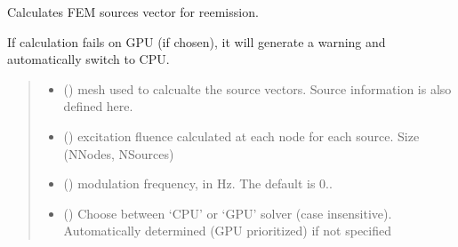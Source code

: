 \documentclass[letterpaper,10pt,english]{sphinxmanual}
\begin{document}
\begin{fulllineitems}
\label{\detokenize{_autosummary/nirfasterff.math.gen_sources_fl:nirfasterff.math.gen_sources_fl}}
\pysigstartsignatures
{}
\pysigstopsignatures
\sphinxAtStartPar
Calculates FEM sources vector for re\sphinxhyphen{}emission.

\sphinxAtStartPar
If calculation fails on GPU (if chosen), it will generate a warning and automatically switch to CPU.
\begin{quote}\begin{description}
\begin{itemize}
\item {} 
\sphinxAtStartPar
{} () \textendash{} mesh used to calcualte the source vectors. Source information is also defined here.

\item {} 
\sphinxAtStartPar
{} () \textendash{} excitation fluence calculated at each node for each source. Size (NNodes, NSources)

\item {} 
\sphinxAtStartPar
{} (\sphinxstyleliteralemphasis{\sphinxupquote{, }}) \textendash{} modulation frequency, in Hz. The default is 0..

\item {} 
\sphinxAtStartPar
{} (\sphinxstyleliteralemphasis{\sphinxupquote{, }}) \textendash{} Choose between ‘CPU’ or ‘GPU’ solver (case insensitive). Automatically determined (GPU prioritized) if not specified


\end{itemize}
\end{description}
\end{quote}
\end{fulllineitems}
\end{document}

